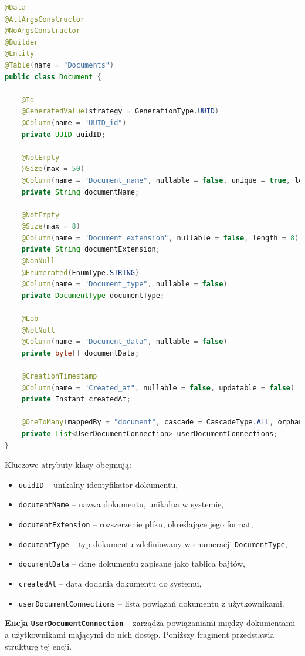 \begin{lstlisting}[language=Java, style=JavaStyle, caption=Encja \texttt{Document}]
@Data
@AllArgsConstructor
@NoArgsConstructor
@Builder
@Entity
@Table(name = "Documents")
public class Document {

    @Id
    @GeneratedValue(strategy = GenerationType.UUID)
    @Column(name = "UUID_id")
    private UUID uuidID; 

    @NotEmpty
    @Size(max = 50)
    @Column(name = "Document_name", nullable = false, unique = true, length = 50)
    private String documentName; 

    @NotEmpty
    @Size(max = 8)
    @Column(name = "Document_extension", nullable = false, length = 8)
    private String documentExtension;
    @NonNull
    @Enumerated(EnumType.STRING)
    @Column(name = "Document_type", nullable = false)
    private DocumentType documentType; 

    @Lob
    @NotNull
    @Column(name = "Document_data", nullable = false)
    private byte[] documentData;

    @CreationTimestamp
    @Column(name = "Created_at", nullable = false, updatable = false)
    private Instant createdAt; 

    @OneToMany(mappedBy = "document", cascade = CascadeType.ALL, orphanRemoval = true)
    private List<UserDocumentConnection> userDocumentConnections; 
}
\end{lstlisting}

\noindent Kluczowe atrybuty klasy obejmują:
\begin{itemize}
    \item \texttt{uuidID} -- unikalny identyfikator dokumentu,
    \item \texttt{documentName} -- nazwa dokumentu, unikalna w systemie,
    \item \texttt{documentExtension} -- rozszerzenie pliku, określające jego format,
    \item \texttt{documentType} -- typ dokumentu zdefiniowany w enumeracji \texttt{DocumentType},
    \item \texttt{documentData} -- dane dokumentu zapisane jako tablica bajtów,
    \item \texttt{createdAt} -- data dodania dokumentu do systemu,
    \item \texttt{userDocumentConnections} -- lista powiązań dokumentu z użytkownikami.
\end{itemize}

\noindent \textbf{Encja \texttt{UserDocumentConnection}} -- zarządza powiązaniami między dokumentami a użytkownikami mającymi do nich dostęp. Poniższy fragment przedstawia strukturę tej encji.

